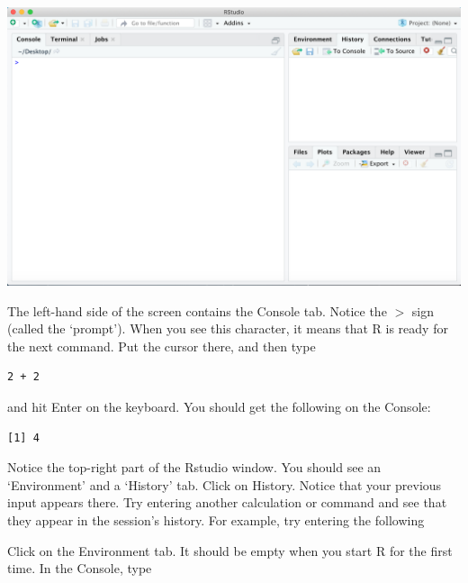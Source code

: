 \begin{center}\includegraphics[width=0.7\linewidth]{images/RstudioMain} \end{center}

The left-hand side of the screen contains the Console tab. Notice the \(>\) sign (called the `prompt'). When you see this character, it means that R is ready for the next command. Put the cursor there, and then type

\begin{verbatim}
2 + 2
\end{verbatim}

and hit Enter on the keyboard. You should get the following on the Console:

\begin{verbatim}
[1] 4
\end{verbatim}

Notice the top-right part of the Rstudio window. You should see an `Environment' and a `History' tab. Click on History. Notice that your previous input appears there. Try entering another calculation or command and see that they appear in the session's history. For example, try entering the following

\begin{Shaded}
\begin{Highlighting}[]
 \SpecialCharTok{\^{}} 
\NormalTok{()}
\end{Highlighting}
\end{Shaded}

Click on the Environment tab. It should be empty when you start R for the first time. In the Console, type

\begin{Shaded}
\begin{Highlighting}[]
\OtherTok{\textless{}{-}} \NormalTok{(}\NormalTok{)}
\end{Highlighting}
\end{Shaded}

